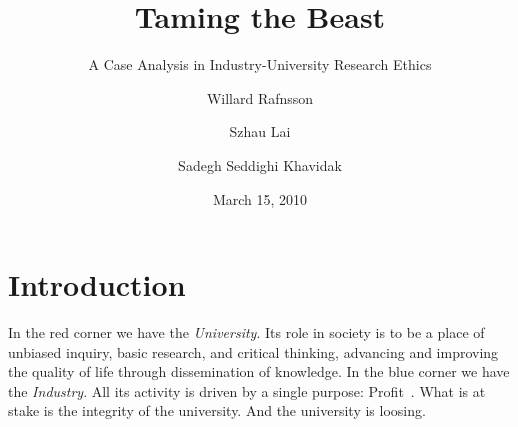 \documentclass[draft,11pt,openright,monochrome,british,a4paper]{scrartcl}
\begin{document}
\title{Taming the Beast}
\subtitle{A Case Analysis in Industry-University Research Ethics}
\author{Willard Rafnsson \and Szhau Lai \and Sadegh Seddighi Khavidak}
\date{March 15, 2010}
\subject{Ethics, Science \& Society}
\maketitle

\section{Introduction}
In the red corner we have the \emph{University}. Its role in society
is to be a place of unbiased inquiry, basic research, and critical
thinking\cite{washburn2001}, advancing and improving the quality of
life through dissemination of knowledge. In the blue corner we have
the \emph{Industry}. All its activity is driven by a single purpose:
Profit~\cite{pain2008}. What is at stake is the integrity of the
university. And the university is loosing.
\end{document}
